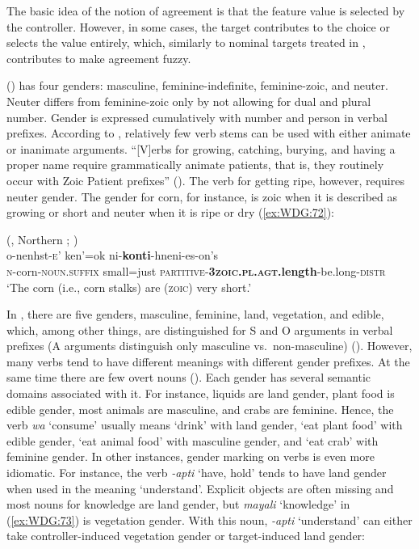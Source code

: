 \documentclass[output=collectionpaper]{langsci/langscibook}
\begin{document}
The basic idea of the notion of agreement is that the feature value is selected by the controller. However, in some cases, the target contributes to the choice or selects the value entirely, which, similarly to nominal targets treated in , contributes to make agreement fuzzy.

 () has four genders: masculine, feminine-indefinite, feminine-zoic, and neuter. Neuter differs from feminine-zoic only by not allowing for dual and plural number. Gender is expressed cumulatively with number and person in verbal prefixes. According to \cite[155]{Mithun2014}, relatively few verb stems can be used with either animate or inanimate arguments. ``[V]erbs for growing, catching, burying, and having a proper name require grammatically animate patients, that is, they routinely occur with Zoic Patient prefixes'' (\citealt[155]{Mithun2014}). The verb for getting ripe, however, requires neuter gender. The gender for corn, for instance, is zoic when it is described as growing or short and neuter when it is ripe or dry (\ref{ex:WDG:72}):

\ea\label{ex:WDG:72}
 (, Northern ; \citealt[154]{Mithun2014})\\
\gll o-nenhst-\textsc{e}'	ken'=ok 	ni-\textbf{konti}-hneni-es-on's\\
\textsc{n}-corn-\textsc{noun.suffix}	small=just	\textsc{partitive-\textbf{3zoic.pl.agt}}\textbf{.length}-be.long-\textsc{distr}\\
\glt `The corn (i.e., corn stalks) are (\textsc{zoic}) very short.'\\
\z

In , there are five genders, masculine, feminine, land, vegetation, and edible, which, among other things, are distinguished for S and O arguments in verbal prefixes (A arguments distinguish only masculine vs.\ non-masculine) (\citealt[984]{Singer2012}). However, many verbs tend to have different meanings with different gender prefixes. At the same time there are few overt nouns (\citealt[117]{Singer2018}). Each gender has several semantic domains associated with it. For instance, liquids are land gender, plant food is edible gender, most animals are masculine, and crabs are feminine. Hence, the  verb \textit{wa} `consume' usually means `drink' with land gender, `eat plant food' with edible gender, `eat animal food' with masculine gender, and `eat crab' with feminine gender. In other instances, gender marking on verbs is even more idiomatic. For instance, the  verb \textit{-apti} `have, hold' tends to have land gender when used in the meaning `understand'. Explicit objects are often missing and most nouns for knowledge are land gender, but \textit{mayali} `knowledge' in (\ref{ex:WDG:73}) is vegetation gender. With this noun, \mbox{\textit{-apti}} `understand' can either take controller-induced vegetation gender or target-induced land gender:
\end{document}
